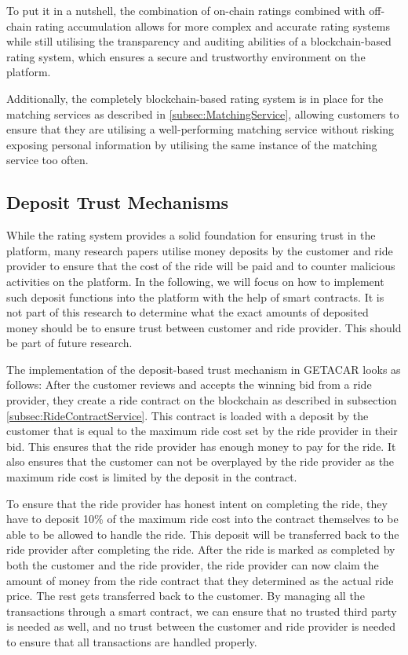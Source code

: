 To put it in a nutshell, the combination of on-chain ratings combined with off-chain rating accumulation allows for more complex and accurate rating systems while still utilising the transparency and auditing abilities of a blockchain-based rating system, which ensures a secure and trustworthy environment on the platform.

Additionally, the completely blockchain-based rating system is in place for the matching services as described in \ref{subsec:MatchingService}, allowing customers to ensure that they are utilising a well-performing matching service without risking exposing personal information by utilising the same instance of the matching service too often.

\subsection{Deposit Trust Mechanisms}\label{subsec:DepositTrust}
While the rating system provides a solid foundation for ensuring trust in the platform, many research papers utilise money deposits by the customer and ride provider to ensure that the cost of the ride will be paid and to counter malicious activities on the platform. In the following, we will focus on how to implement such deposit functions into the platform with the help of smart contracts. It is not part of this research to determine what the exact amounts of deposited money should be to ensure trust between customer and ride provider. This should be part of future research.

The implementation of the deposit-based trust mechanism in GETACAR looks as follows:
After the customer reviews and accepts the winning bid from a ride provider, they create a ride contract on the blockchain as described in subsection \ref{subsec:RideContractService}. This contract is loaded with a deposit by the customer that is equal to the maximum ride cost set by the ride provider in their bid. This ensures that the ride provider has enough money to pay for the ride. It also ensures that the customer can not be overplayed by the ride provider as the maximum ride cost is limited by the deposit in the contract. 

To ensure that the ride provider has honest intent on completing the ride, they have to deposit 10\% of the maximum ride cost into the contract themselves to be able to be allowed to handle the ride. This deposit will be transferred back to the ride provider after completing the ride.  After the ride is marked as completed by both the customer and the ride provider, the ride provider can now claim the amount of money from the ride contract that they determined as the actual ride price. The rest gets transferred back to the customer. By managing all the transactions through a smart contract, we can ensure that no trusted third party is needed as well, and no trust between the customer and ride provider is needed to ensure that all transactions are handled properly.

